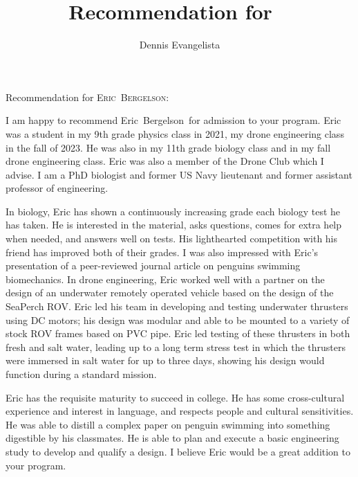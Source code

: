 \documentclass[12pt]{letter}
\title{Recommendation for \firstname\ \lastname}
\author{Dennis Evangelista}
\date{}
\newcommand\firstname{Eric}
\newcommand\lastname{Bergelson}
\begin{document}
\begin{letter}{%
}

\opening{Recommendation for {\scshape\firstname\ \lastname}:}

I am happy to recommend \firstname\ \lastname\ for admission to your program.  Eric was a student in my 9th grade physics class in 2021, my drone engineering class in the fall of 2023. He was also in my 11th grade biology class and in my fall drone engineering class.  Eric was also a member of the Drone Club which I advise. I am a PhD biologist and former US Navy lieutenant and former assistant professor of engineering. 

In biology, Eric has shown a continuously increasing grade each biology test he has taken.  He is interested in the material, asks questions, comes for extra help when needed, and answers well on tests. His lighthearted competition with his friend has improved both of their grades. I was also impressed with Eric's presentation of a peer-reviewed journal article on penguins swimming biomechanics. In drone engineering, Eric worked well with a partner on the design of an underwater remotely operated vehicle based on the design of the SeaPerch ROV.  Eric led his team in developing and testing underwater thrusters using DC motors; his design was modular and able to be mounted to a variety of stock ROV frames based on PVC pipe. Eric led testing of these thrusters in both fresh and salt water, leading up to a long term stress test in which the thrusters were immersed in salt water for up to three days, showing his design would function during a standard mission. 

Eric has the requisite maturity to succeed in college. He has some cross-cultural experience and interest in language, and respects people and cultural sensitivities. He was able to distill a complex paper on penguin swimming into something digestible by his classmates. He is able to plan and execute a basic engineering study to develop and qualify a design. I believe Eric would be a great addition to your program. 

\noclosing

\end{letter}
\end{document}
